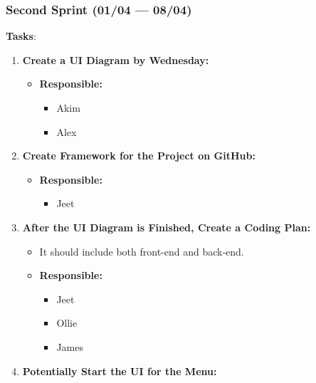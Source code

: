 \documentclass[12pt]{article}
\begin{document}
\hypertarget{second-sprint-0104-0804}{%
\subsubsection{Second Sprint (01/04 ---
08/04)}\label{second-sprint-0104-0804}}

\textbf{Tasks}:

\begin{enumerate}
\def\labelenumi{\arabic{enumi}.}
\tightlist
\item
  \textbf{Create a UI Diagram by Wednesday:}

  \begin{itemize}
  \tightlist
  \item
    \textbf{Responsible:}

    \begin{itemize}
    \tightlist
    \item
      Akim
    \item
      Alex
    \end{itemize}
  \end{itemize}
\item
  \textbf{Create Framework for the Project on GitHub:}

  \begin{itemize}
  \tightlist
  \item
    \textbf{Responsible:}

    \begin{itemize}
    \tightlist
    \item
      Jeet
    \end{itemize}
  \end{itemize}
\item
  \textbf{After the UI Diagram is Finished, Create a Coding Plan:}

  \begin{itemize}
  \tightlist
  \item
    It should include both front-end and back-end.
  \item
    \textbf{Responsible:}

    \begin{itemize}
    \tightlist
    \item
      Jeet
    \item
      Ollie
    \item
      James
    \end{itemize}
  \end{itemize}
\item
  \textbf{Potentially Start the UI for the Menu:}


\end{enumerate}
\end{document}
